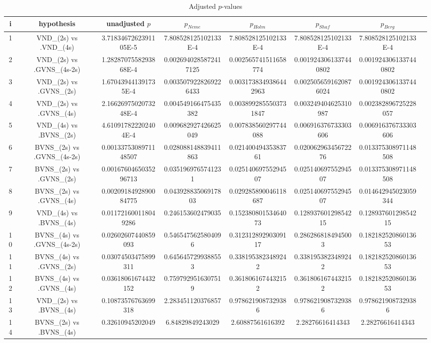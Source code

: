 \documentclass[a4paper,10pt]{article}
\begin{document}
\begin{landscape}
\begin{table}[!htp]
\centering\tiny
\caption{Adjusted $p$-values}
\begin{tabular}{cccccccc}
i&hypothesis&unadjusted $p$&$p_{Neme}$&$p_{Holm}$&$p_{Shaf}$&$p_{Berg}$\\
\hline
1&VND_(2s) vs .VND_(4s)&3.7183467262391105E-5&7.808528125102133E-4&7.808528125102133E-4&7.808528125102133E-4&7.808528125102133E-4\\
2&VND_(2s) vs .GVNS_(4s-2s)&1.2828707558293868E-4&0.0026940285872417125&0.002565741511658774&0.0019243061337440802&0.0019243061337440802\\
3&VND_(2s) vs .GVNS_(2s)&1.670439441391735E-4&0.0035079228269226433&0.0031738349386442963&0.0025056591620876024&0.0019243061337440802\\
4&VND_(2s) vs .GVNS_(4s)&2.1662697502073248E-4&0.004549166475435382&0.0038992855503731847&0.003249404625310987&0.002382896725228057\\
5&VND_(4s) vs .BVNS_(2s)&4.610917822202404E-4&0.009682927426625049&0.007838560297744088&0.006916376733303606&0.006916376733303606\\
6&BVNS_(2s) vs .GVNS_(4s-2s)&0.0013375308971148507&0.028088148839411863&0.02140049435383761&0.02006296345672276&0.013375308971148508\\
7&BVNS_(2s) vs .GVNS_(2s)&0.0016760465035296713&0.0351969765741231&0.02514069755294507&0.02514069755294507&0.013375308971148508\\
8&BVNS_(2s) vs .GVNS_(4s)&0.0020918492890084775&0.04392883506917803&0.029285890046118687&0.02514069755294507&0.014642945023059344\\
9&VND_(4s) vs .BVNS_(4s)&0.011721600118049286&0.246153602479035&0.15238080153464073&0.12893760129854215&0.12893760129854215\\
10&BVNS_(4s) vs .GVNS_(4s-2s)&0.02602607440859093&0.5465475625804096&0.31231289290309117&0.2862868184945003&0.18218252086013653\\
11&BVNS_(4s) vs .GVNS_(2s)&0.03074503475899311&0.6456457299388553&0.3381953823489242&0.3381953823489242&0.18218252086013653\\
12&BVNS_(4s) vs .GVNS_(4s)&0.03618061674432152&0.7597929516307519&0.3618061674432152&0.3618061674432152&0.18218252086013653\\
13&VND_(2s) vs .BVNS_(4s)&0.10873576763699318&2.283451120376857&0.9786219087329386&0.9786219087329386&0.9786219087329386\\
14&BVNS_(2s) vs .BVNS_(4s)&0.32610945202049&6.84829849243029&2.60887561616392&2.28276616414343&2.28276616414343\\

\end{tabular}
\end{table}
\end{landscape}
\end{document}
